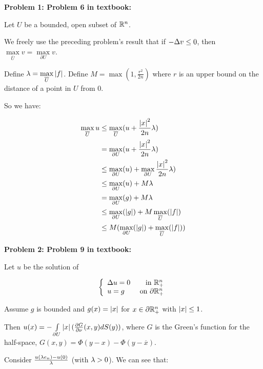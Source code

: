 \documentclass[a4paper,12pt]{article}
\begin{document}
{\bf Problem 1: Problem 6 in textbook:} %

Let $U$ be a bounded, open subset of $\mathbb{R}^n$.

We freely use the preceding problem's result that if $-\Delta v \leq 0$, then $\max\limits_{\overline{U}} v = \max\limits_{\partial U} v$.

Define $\lambda = \max\limits_{\overline{U}} \left\lvert f \right\rvert$. Define $M = \max(1,\frac{r^2}{2n})$ where $r$ is an upper bound on the distance of a point in $U$ from $0$.

So we have:

\begin{align*}
\max\limits_{\overline{U}} u &\leq \max\limits_{\overline{U}} (u + \frac{\left\lvert x \right\rvert^2}{2n} \lambda) \\
&= \max\limits_{\partial U} (u + \frac{\left\lvert x \right\rvert^2}{2n} \lambda)\\
&\leq \max\limits_{\partial U} (u) +\max\limits_{\partial U} \frac{\left\lvert x \right\rvert^2}{2n} \lambda)\\
&\leq \max\limits_{\partial U} (u) +M \lambda\\
&= \max\limits_{\partial U} (g) +M \lambda\\
&\leq \max\limits_{\partial U} (\left\lvert g \right\rvert) + M \max\limits_{\overline{U}} (\left\lvert f \right\rvert)\\
&\leq M(\max\limits_{\partial U} (\left\lvert g \right\rvert) + \max\limits_{\overline{U}} (\left\lvert f \right\rvert))\\
\end{align*} 

\shunt

{\bf Problem 2: Problem 9 in textbook:}

Let $u$ be the solution of 

\begin{displaymath}
   \left\{
     \begin{array}{lr}
       \Delta u = 0 & \text{ in } \mathbb{R}_+^n\\
       u=g & \text{ on }\partial \mathbb{R}_+^n
     \end{array}
   \right.
\end{displaymath}

Assume $g$ is bounded and $g(x) = \left\lvert x \right\rvert$ for $x \in \partial \mathbb{R}_+^n$ with $\left\lvert x \right\rvert\leq 1$.

Then $u(x) = -\int\limits_{\partial U} \left\lvert x \right\rvert (\frac{\partial G}{\partial \nu} (x,y) dS(y))$, where $G$ is the Green's function for the half-space, $G(x,y) = \Phi(y-x) - \Phi(y-\overline{x})$.

Consider $\frac{u(\lambda e_n) - u(0)}{\lambda}$ (with $\lambda >0$). We can see that: %
\end{document}
